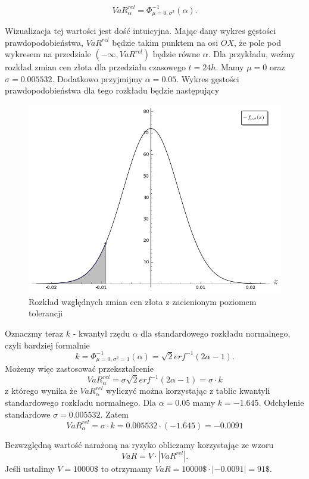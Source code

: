 \documentclass[11pt,titlepage]{article}
\numberwithin{equation}{section}
\begin{document}
$$VaR_{\alpha}^{rel}   =\Phi_{\mu=0,\sigma^{2}}^{-1}(\alpha).$$

Wizualizacja tej wartości jest dość intuicyjna. Mając dany wykres gęstości prawdopodobieństwa, $VaR^{rel}$ będzie takim punktem na osi $OX$, że pole pod wykresem na przedziale $(-\infty,VaR^{rel})$  będzie równe $\alpha$. Dla przykładu, weźmy rozkład zmian cen złota dla przedziału czasowego $t=24h$. Mamy $\mu=0$ oraz $\sigma=0.005532$. Dodatkowo przyjmijmy $\alpha=0.05$. Wykres gęstości prawdopodobieństwa dla tego rozkładu będzie następujący

\begin{figure}[H]
\begin{center}
\includegraphics[scale=0.5]{chart1.png}
\end{center}
\caption{Rozkład względnych zmian cen złota z zacienionym poziomem tolerancji} \label{czynnosci_GD}
\end{figure} 


Oznaczmy teraz $k$ - kwantyl rzędu $\alpha$ dla standardowego rozkładu normalnego, czyli bardziej formalnie 
$$k=\Phi_{\mu=0,\sigma^{2}=1}^{-1}(\alpha)=\sqrt{2} erf^{-1}(2\alpha-1).$$
Możemy więc zastosować przekształcenie
$$VaR_{\alpha}^{rel}   =\sigma \sqrt{2} erf^{-1}(2\alpha-1)=\sigma \cdot k$$
z którego wynika że $VaR_{\alpha}^{rel}$ wyliczyć można korzystając z tablic kwantyli standardowego rozkładu normalnego. Dla $\alpha=0.05$ mamy $k=-1.645$. Odchylenie standardowe $\sigma=0.005532$. Zatem
$$VaR_{\alpha}^{rel}=\sigma \cdot k= 0.005532 \cdot (-1.645)=-0.0091$$

Bezwzględną wartość narażoną na ryzyko obliczamy korzystając ze wzoru
$$VaR = V \cdot |VaR^{rel}|.$$
Jeśli ustalimy $V=10000\$$ to otrzymamy $VaR = 10000\$ \cdot |-0.0091| = 91\$ $.
\end{document}
